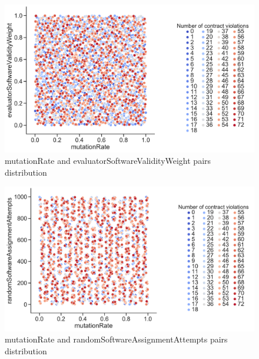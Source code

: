 \begin{figure}
	\centering
	\includegraphics[width=\textwidth]{images/PairsDistr/mutationRate_evaluatorSoftwareValidityWeight.pdf}
	\caption[mutationRate and evaluatorSoftwareValidityWeight pairs distribution]{mutationRate and evaluatorSoftwareValidityWeight pairs distribution}
	\label{fig:mutationRate_evaluatorSoftwareValidityWeight_pair}
\end{figure}
\begin{figure}
	\centering
	\includegraphics[width=\textwidth]{images/PairsDistr/mutationRate_randomSoftwareAssignmentAttempts.pdf}
	\caption[mutationRate and randomSoftwareAssignmentAttempts pairs distribution]{mutationRate and randomSoftwareAssignmentAttempts pairs distribution}
	\label{fig:mutationRate_randomSoftwareAssignmentAttempts_pair}
\end{figure}

